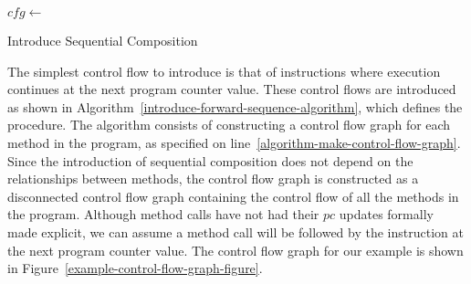 \begin{algorithm}
  \begin{algorithmic}[1]
    \State $cfg \gets$ 
    \label{algorithm-make-control-flow-graph}
    \label{algorithm-sequence-cfg-loop}
    \label{algorithm-forward-sequence-condition}
    \State {}
    \label{algorithm-forward-sequence-application}
    \EndWhile
    \EndFor
    \EndProcedure
  \end{algorithmic}
  \caption{Introduce Sequential Composition}
  \label{introduce-forward-sequence-algorithm}
\end{algorithm}
The simplest control flow to introduce is that of instructions where
execution continues at the next program counter value.
These control flows are introduced as shown in
Algorithm~\ref{introduce-forward-sequence-algorithm}, which defines
the  procedure.
The algorithm consists of constructing a control flow graph for each
method in the program, as specified on
line~\ref{algorithm-make-control-flow-graph}.
Since the introduction of sequential composition does not depend on
the relationships between methods, the control flow graph is
constructed as a disconnected control flow graph containing the
control flow of all the methods in the program.
Although method calls have not had their $pc$ updates formally made
explicit, we can assume a method call will be followed by the
instruction at the next program counter value.
The control flow graph for our example is shown in
Figure~\ref{example-control-flow-graph-figure}.

